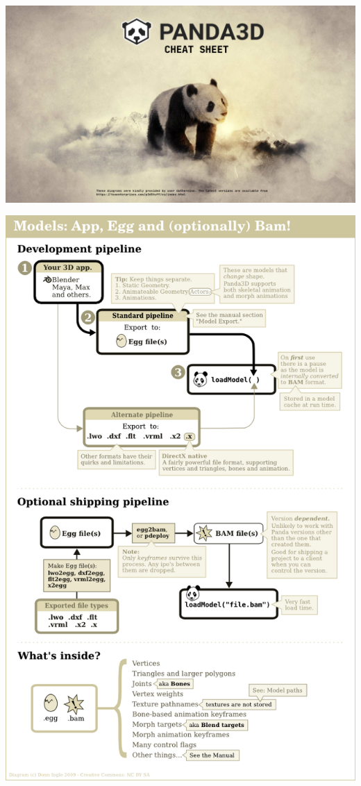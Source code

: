 \documentclass[a4paper,10pt]{book}
\begin{document}
\pagestyle{empty}
\includegraphics[width=\textwidth]{title.png}
\newpage

\begin{center}
\includegraphics[scale=0.8]{AppEggBam.png} 
\end{center}
\end{document}
